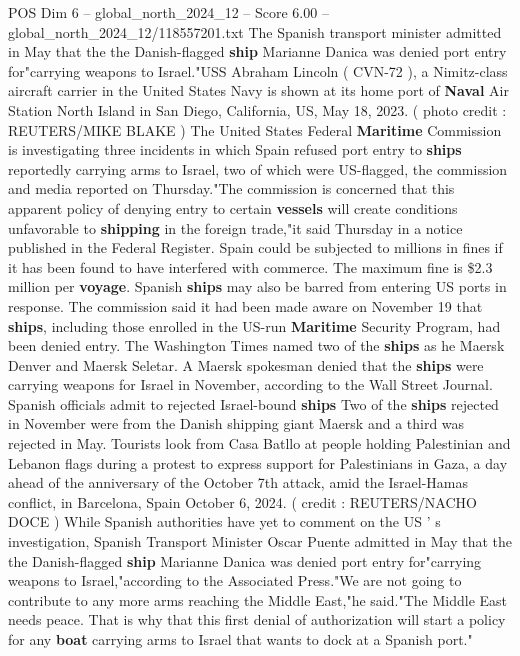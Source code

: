 \begin{textsample}{POS Dim 6 – global\_north\_2024\_12 – Score 6.00 – global\_north\_2024\_12/118557201.txt}  \label{ex:f6_pos_265}
The Spanish transport minister admitted in May that the the Danish-flagged \textbf{ship} Marianne Danica was denied port entry for"carrying weapons to Israel."USS Abraham Lincoln ( CVN-72 ), a Nimitz-class aircraft carrier in the United States Navy is shown at its home port of \textbf{Naval} Air Station North Island in San Diego, California, US, May 18, 2023. ( photo credit : REUTERS/MIKE BLAKE ) The United States Federal \textbf{Maritime} Commission is investigating three incidents in which Spain refused port entry to \textbf{ships} reportedly carrying arms to Israel, two of which were US-flagged, the commission and media reported on Thursday."The commission is concerned that this apparent policy of denying entry to certain \textbf{vessels} will create conditions unfavorable to \textbf{shipping} in the foreign trade,"it said Thursday in a notice published in the Federal Register.
Spain could be subjected to millions in fines if it has been found to have interfered with commerce.
The maximum fine is \$2.3 million per \textbf{voyage}.
Spanish \textbf{ships} may also be barred from entering US ports in response.
The commission said it had been made aware on November 19 that \textbf{ships}, including those enrolled in the US-run \textbf{Maritime} Security Program, had been denied entry.
The Washington Times named two of the \textbf{ships} as he Maersk Denver and Maersk Seletar.
A Maersk spokesman denied that the \textbf{ships} were carrying weapons for Israel in November, according to the Wall Street Journal.
Spanish officials admit to rejected Israel-bound \textbf{ships} Two of the \textbf{ships} rejected in November were from the Danish shipping giant Maersk and a third was rejected in May.
Tourists look from Casa Batllo at people holding Palestinian and Lebanon flags during a protest to express support for Palestinians in Gaza, a day ahead of the anniversary of the October 7th attack, amid the Israel-Hamas conflict, in Barcelona, Spain October 6, 2024. ( credit : REUTERS/NACHO DOCE ) While Spanish authorities have yet to comment on the US ' s investigation, Spanish Transport Minister Oscar Puente admitted in May that the the Danish-flagged \textbf{ship} Marianne Danica was denied port entry for"carrying weapons to Israel,"according to the Associated Press."We are not going to contribute to any more arms reaching the Middle East,"he said."The Middle East needs peace.
That is why that this first denial of authorization will start a policy for any \textbf{boat} carrying arms to Israel that wants to dock at a Spanish port."

\end{textsample}
